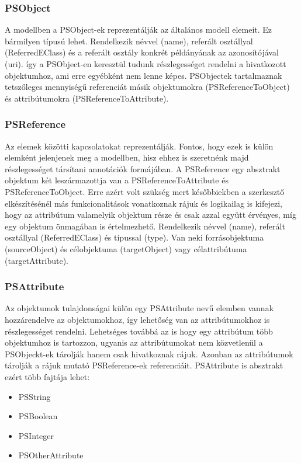 \subsubsection{PSObject}
A modellben a PSObject-ek reprezentálják az általános modell elemeit. Ez bármilyen típusú lehet. Rendelkezik névvel (name), referált osztállyal (ReferredEClass) és a referált osztály konkrét példányának az azonosítójával (uri). így a PSObject-en keresztül tudunk részlegességet rendelni a hivatkozott objektumhoz, ami erre egyébként nem lenne képes. PSObjectek tartalmaznak tetszőleges mennyiségű referenciát másik objektumokra (PSReferenceToObject) és attribútumokra (PSReferenceToAttribute).

\subsubsection{PSReference}
 Az elemek közötti kapcsolatokat reprezentálják. Fontos, hogy ezek is külön elemként jelenjenek meg a modellben, hisz ehhez is szeretnénk majd részlegességet társítani annotációk formájában. A PSReference egy absztrakt objektum két leszármazottja van a  PSReferenceToAttribute és PSReferenceToObject. Erre azért volt szükség mert későbbiekben a szerkesztő elkészítésénél más funkcionalitások vonatkoznak rájuk és logikailag is kifejezi, hogy az attribútum valamelyik objektum része és csak azzal együtt érvényes, míg egy objektum önmagában is értelmezhető. Rendelkezik névvel (name), referált osztállyal (ReferredEClass) és típussal (type). Van neki forrásobjektuma (sourceObject) és célobjektuma (targetObject) vagy célattribútuma (targetAttribute).

\subsubsection{PSAttribute}
Az objektumok tulajdonságai külön egy PSAttribute nevű elemben vannak hozzárendelve az objektumokhoz, így lehetőség van az attribútumokhoz is részlegességet rendelni. Lehetséges továbbá az is hogy egy attribútum több objektumhoz is tartozzon, ugyanis az attribútumokat nem közvetlenül a PSObjeckt-ek tárolják hanem csak hivatkoznak rájuk. Azonban az attribútumok tárolják a rájuk mutató PSReference-ek referenciáit. PSAttribute is absztrakt ezért több fajtája lehet:

\begin{itemize}  
	\item PSString
	\item PSBoolean
	\item PSInteger
	\item PSOtherAttribute 
\end{itemize}


